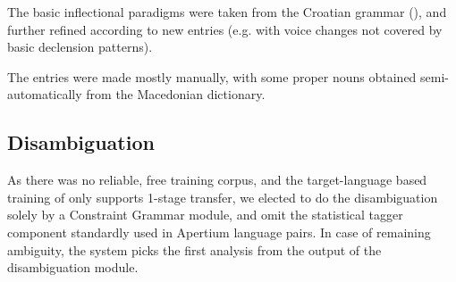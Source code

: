 \documentclass{book}
\begin{document}
The basic inflectional paradigms were taken from the Croatian grammar (\citealp{baric1997hrvatska}), 
and further refined according to new entries (e.g. with voice changes not covered by basic declension
patterns).

The entries were made mostly manually, with some proper nouns obtained semi-automatically from the Macedonian
dictionary.

\subsection*{Disambiguation}
As there was no reliable, free training corpus, and the target-language 
based training of \cite{sanchez2008using} only supports 1-stage transfer, we elected 
to do the disambiguation solely by a Constraint Grammar module, and omit the
statistical tagger component standardly used in Apertium language pairs. In case of remaining 
ambiguity, the system picks the first analysis from the output of the disambiguation 
module.


\end{document}
